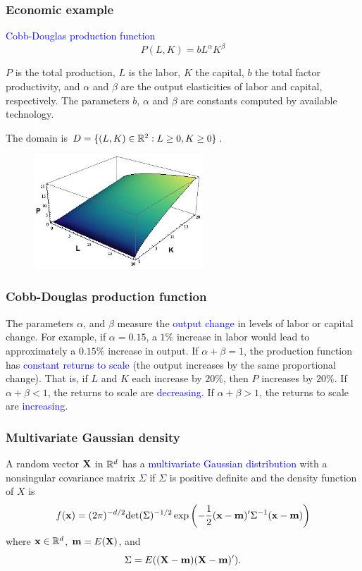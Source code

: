 \documentclass[11pt,aspectratio=169]{beamer}
\begin{document}
\begin{frame}
\frametitle{Economic example}
\begin{small}
 \textcolor{blue}{Cobb-Douglas production function} $$P(L,K)=b L^{\alpha} K^{\beta}$$
 \begin{tiny}$P$ is the total production, $L$ is the labor, $K$ the capital, $b$ the total factor productivity, and $\alpha$ and $\beta$ are the output elasticities of labor and capital, respectively. The parameters $b$, $\alpha$ and $\beta$ are constants computed by available technology. \end{tiny}
 
 The domain is 
$D=\{(L,K) \in \mathbb R^2: L \geq 0, K \geq 0\}$.
\end{small}
\begin{figure}
\includegraphics[width=2.5in]{img/cd.jpg} 
\end{figure}
\end{frame}

\begin{frame}
\frametitle{Cobb-Douglas production function}
\begin{small}
The  parameters  $\alpha$, and $\beta$ measure the \textcolor{blue}{output change} in  levels of labor or capital change. For example, if $\alpha=0.15$, a $1\%$ increase in  labor would lead to approximately a $0.15\%$ increase  in output.
 \vskip 12pt
 If $\alpha+\beta=1$, the  production function has  \textcolor{blue}{constant returns to scale} (the  output increases by the same proportional change). That is, if  $L$ and $K$ each increase by  $20\%$, then $P$ increases  by $20\%$.
 \vskip 12pt
 If $\alpha+\beta<1$, the returns to scale are \textcolor{blue}{decreasing}.
 \vskip 12pt
 If $\alpha+\beta>1$,  the returns to scale are \textcolor{blue}{increasing}.
 
\end{small}

\end{frame}

\begin{frame}
\frametitle{Multivariate Gaussian density}
\begin{small}
 A random vector ${\bf X}$ in $\mathbb R^d$ has a 
 \textcolor{blue}{multivariate Gaussian distribution}
 with a nonsingular covariance matrix $\Sigma$ if $\Sigma$ is positive definite and the density function of $X$ is
 $$
 f({\bf x})=(2 \pi)^{-d/2} \text{det}(\Sigma)^{-1/2} \exp \left(
-\frac12 ({\bf x}-{\bf m})' \Sigma^{-1} ({\bf x}-{\bf m})\right)
 $$
 where ${\bf x} \in \mathbb R^d$, ${\bf m}=E({\bf X})$, and 
 $$
 \Sigma=E(({\bf X}-{\bf m})({\bf X}-{\bf m})').
 $$
\end{small}
\end{frame}
\end{document}
